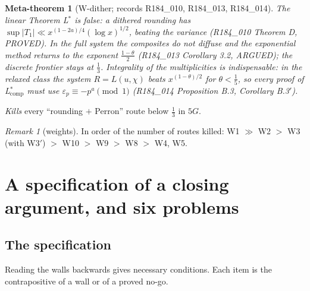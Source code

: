 \documentclass[11pt]{amsart}
\newtheorem{metatheorem}[theorem]{Meta-theorem}
\theoremstyle{definition}
\theoremstyle{remark}
\newtheorem{remark}[theorem]{Remark}
\begin{document}
\begin{metatheorem}[W-dither; records R184\_010, R184\_013, R184\_014]\label{Wdither}
The linear Theorem L$^*$ is false: a dithered rounding has $\sup|T_1|\ll x^{(1-2a)/4}(\log x)^{1/2}$, beating the variance
(R184\_010 Theorem D, PROVED). In the full system the composites do not diffuse and the exponential method returns to the exponent
$\frac{1-\theta}2$ (R184\_013 Corollary 3.2, ARGUED); the discrete frontier stays at $\frac13$. Integrality of the multiplicities
is indispensable: in the relaxed class the system $R=L(u,\chi)$ beats $x^{(1-\theta)/2}$ for $\theta<\frac15$, so every proof of
L$^*_{\mathrm{comp}}$ must use $\varepsilon_p\equiv-p^a\pmod 1$ (R184\_014 Proposition B.3, Corollary B.3$'$).
\end{metatheorem}
\noindent \emph{Kills} every ``rounding $+$ Perron'' route below $\frac13$ in $5G$.

\begin{remark}[weights]
In order of the number of routes killed: W1 $\gg$ W2 $>$ W3 (with W3$'$) $>$ W10 $>$ W9 $>$ W8 $>$ W4, W5.
\end{remark}

\section{A specification of a closing argument, and six problems}\label{sec:spec}

\subsection{The specification}
Reading the walls backwards gives necessary conditions. Each item is the contrapositive of a wall or of a
proved no-go.
\end{document}
